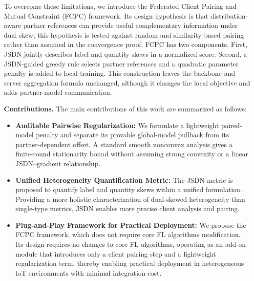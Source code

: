 \documentclass[journal,twoside,web]{ieeecolor}
\begin{document}

To overcome these limitations, we introduce the Federated Client Pairing and Mutual Constraint (FCPC) framework. Its design hypothesis is that distribution-aware partner references can provide useful complementary information under dual skew; this hypothesis is tested against random and similarity-based pairing rather than assumed in the convergence proof. FCPC has two components. First, JSDN jointly describes label and quantity skews in a normalized score. Second, a JSDN-guided greedy rule selects partner references and a quadratic parameter penalty is added to local training. This construction leaves the backbone and server aggregation formula unchanged, although it changes the local objective and adds partner-model communication.



\textbf{Contributions.} The main contributions of this work are summarized as follows:

\begin{itemize}
      \item \textbf{Auditable Pairwise Regularization:} We formulate a lightweight paired-model penalty and separate its provable global-model pullback from its partner-dependent offset. A standard smooth nonconvex analysis gives a finite-round stationarity bound without assuming strong convexity or a linear JSDN--gradient relationship.

    \item \textbf{Unified Heterogeneity Quantification Metric:} The JSDN metric is proposed to quantify label and quantity skews within a unified formulation. Providing a more holistic characterization of dual-skewed heterogeneity than single-type metrics, JSDN enables more precise client analysis and pairing.

    \item \textbf{Plug-and-Play Framework for Practical Deployment:} We propose the FCPC framework, which does not require core FL algorithms modification. Its design requires no changes to core FL algorithms, operating as an add-on module that introduces only a client pairing step and a lightweight regularization term, thereby enabling practical deployment in heterogeneous IoT environments with minimal integration cost.
    
\end{itemize}
\end{document}
